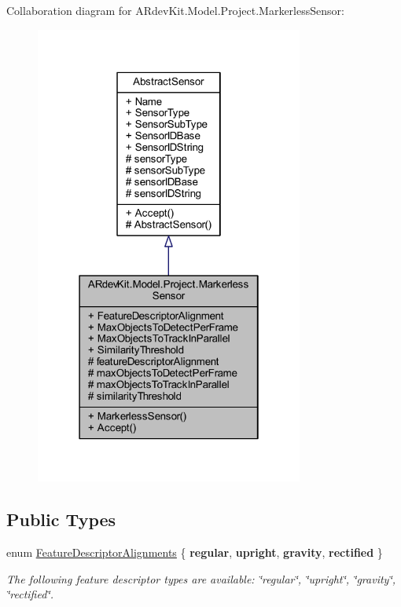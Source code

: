 Collaboration diagram for A\-Rdev\-Kit.\-Model.\-Project.\-Markerless\-Sensor\-:
\nopagebreak
\begin{figure}[H]
\begin{center}
\leavevmode
\includegraphics[width=250pt]{class_a_rdev_kit_1_1_model_1_1_project_1_1_markerless_sensor__coll__graph}
\end{center}
\end{figure}
\subsection*{Public Types}
\begin{DoxyCompactItemize}
\item 
enum \hyperlink{class_a_rdev_kit_1_1_model_1_1_project_1_1_markerless_sensor_a1c0b341ee16aa03d68b67714f1cfca53}{Feature\-Descriptor\-Alignments} \{ {\bfseries regular}, 
{\bfseries upright}, 
{\bfseries gravity}, 
{\bfseries rectified}
 \}
\begin{DoxyCompactList}\small\item\em The following feature descriptor types are available\-: \char`\"{}regular\char`\"{}, \char`\"{}upright\char`\"{}, \char`\"{}gravity\char`\"{}, \char`\"{}rectified\char`\"{}. \end{DoxyCompactList}\end{DoxyCompactItemize}
